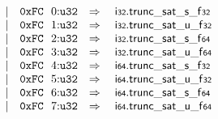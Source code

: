 $$\begin{array}[t]{@{}lrrl@{}l@{}l@{}l@{}}
& & | & \mathtt{0xFC}~~0{:}{\mathtt{u32}} & \quad\Rightarrow\quad{} & \mathsf{i{\scriptstyle 32}} {.} {{\mathsf{trunc\_sat}}{\mathsf{\_}}{\mathsf{s}}}{\mathsf{\_}}{\mathsf{f{\scriptstyle 32}}} \\
& & | & \mathtt{0xFC}~~1{:}{\mathtt{u32}} & \quad\Rightarrow\quad{} & \mathsf{i{\scriptstyle 32}} {.} {{\mathsf{trunc\_sat}}{\mathsf{\_}}{\mathsf{u}}}{\mathsf{\_}}{\mathsf{f{\scriptstyle 32}}} \\
& & | & \mathtt{0xFC}~~2{:}{\mathtt{u32}} & \quad\Rightarrow\quad{} & \mathsf{i{\scriptstyle 32}} {.} {{\mathsf{trunc\_sat}}{\mathsf{\_}}{\mathsf{s}}}{\mathsf{\_}}{\mathsf{f{\scriptstyle 64}}} \\
& & | & \mathtt{0xFC}~~3{:}{\mathtt{u32}} & \quad\Rightarrow\quad{} & \mathsf{i{\scriptstyle 32}} {.} {{\mathsf{trunc\_sat}}{\mathsf{\_}}{\mathsf{u}}}{\mathsf{\_}}{\mathsf{f{\scriptstyle 64}}} \\
& & | & \mathtt{0xFC}~~4{:}{\mathtt{u32}} & \quad\Rightarrow\quad{} & \mathsf{i{\scriptstyle 64}} {.} {{\mathsf{trunc\_sat}}{\mathsf{\_}}{\mathsf{s}}}{\mathsf{\_}}{\mathsf{f{\scriptstyle 32}}} \\
& & | & \mathtt{0xFC}~~5{:}{\mathtt{u32}} & \quad\Rightarrow\quad{} & \mathsf{i{\scriptstyle 64}} {.} {{\mathsf{trunc\_sat}}{\mathsf{\_}}{\mathsf{u}}}{\mathsf{\_}}{\mathsf{f{\scriptstyle 32}}} \\
& & | & \mathtt{0xFC}~~6{:}{\mathtt{u32}} & \quad\Rightarrow\quad{} & \mathsf{i{\scriptstyle 64}} {.} {{\mathsf{trunc\_sat}}{\mathsf{\_}}{\mathsf{s}}}{\mathsf{\_}}{\mathsf{f{\scriptstyle 64}}} \\
& & | & \mathtt{0xFC}~~7{:}{\mathtt{u32}} & \quad\Rightarrow\quad{} & \mathsf{i{\scriptstyle 64}} {.} {{\mathsf{trunc\_sat}}{\mathsf{\_}}{\mathsf{u}}}{\mathsf{\_}}{\mathsf{f{\scriptstyle 64}}} \\
\end{array}
$$

\vspace{1ex}

